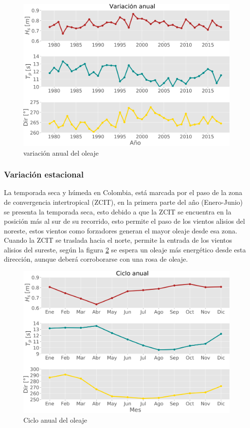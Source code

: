 \documentclass[5p,times,authoryear]{elsarticle}
\begin{document}
\begin{figure}[h]
    \centering
    \includegraphics[scale=0.28]{Graficas/Variacion_interanual}
    \caption{variación anual del oleaje}
    \label{fig:4 variacion anual}
\end{figure}

\subsubsection{Variación estacional}

La temporada seca y húmeda en Colombia, está marcada por el paso de la zona de convergencia intertropical (ZCIT), en la primera parte del año (Enero-Junio) se presenta la temporada seca, esto debido a que la ZCIT se encuentra en la posición más al sur de su recorrido, esto permite el paso de los vientos alisios del noreste, estos vientos como forzadores generan el mayor oleaje desde esa zona. Cuando la ZCIT se traslada hacia el norte, permite la entrada de los vientos alisios del sureste, según la figura \ref{fig:5 ciclo anual} se espera un oleaje más energético desde esta dirección, aunque deberá corroborarse con una rosa de oleaje.

\begin{figure}[h]
    \centering
    \includegraphics[scale=0.28]{Graficas/Ciclo_anual}
    \caption{Ciclo anual del oleaje}
    \label{fig:5 ciclo anual}
\end{figure}
\end{document}
